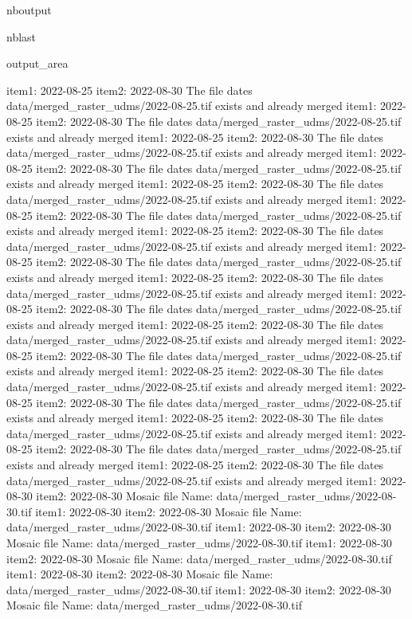 \documentclass[letterpaper,10pt]{sphinxmanual}
\begin{document}
\begin{sphinxuseclass}{nboutput}
\begin{sphinxuseclass}{nblast}
{\begin{sphinxuseclass}{output_area}
\begin{sphinxuseclass}{}
\begin{sphinxVerbatim}[commandchars=\\\{\}]
item1:  2022-08-25
item2:  2022-08-30
The file dates data/merged\_raster\_udms/2022-08-25.tif exists and already merged
item1:  2022-08-25
item2:  2022-08-30
The file dates data/merged\_raster\_udms/2022-08-25.tif exists and already merged
item1:  2022-08-25
item2:  2022-08-30
The file dates data/merged\_raster\_udms/2022-08-25.tif exists and already merged
item1:  2022-08-25
item2:  2022-08-30
The file dates data/merged\_raster\_udms/2022-08-25.tif exists and already merged
item1:  2022-08-25
item2:  2022-08-30
The file dates data/merged\_raster\_udms/2022-08-25.tif exists and already merged
item1:  2022-08-25
item2:  2022-08-30
The file dates data/merged\_raster\_udms/2022-08-25.tif exists and already merged
item1:  2022-08-25
item2:  2022-08-30
The file dates data/merged\_raster\_udms/2022-08-25.tif exists and already merged
item1:  2022-08-25
item2:  2022-08-30
The file dates data/merged\_raster\_udms/2022-08-25.tif exists and already merged
item1:  2022-08-25
item2:  2022-08-30
The file dates data/merged\_raster\_udms/2022-08-25.tif exists and already merged
item1:  2022-08-25
item2:  2022-08-30
The file dates data/merged\_raster\_udms/2022-08-25.tif exists and already merged
item1:  2022-08-25
item2:  2022-08-30
The file dates data/merged\_raster\_udms/2022-08-25.tif exists and already merged
item1:  2022-08-25
item2:  2022-08-30
The file dates data/merged\_raster\_udms/2022-08-25.tif exists and already merged
item1:  2022-08-25
item2:  2022-08-30
The file dates data/merged\_raster\_udms/2022-08-25.tif exists and already merged
item1:  2022-08-25
item2:  2022-08-30
The file dates data/merged\_raster\_udms/2022-08-25.tif exists and already merged
item1:  2022-08-25
item2:  2022-08-30
The file dates data/merged\_raster\_udms/2022-08-25.tif exists and already merged
item1:  2022-08-25
item2:  2022-08-30
The file dates data/merged\_raster\_udms/2022-08-25.tif exists and already merged
item1:  2022-08-25
item2:  2022-08-30
The file dates data/merged\_raster\_udms/2022-08-25.tif exists and already merged
item1:  2022-08-30
item2:  2022-08-30
Mosaic file Name:  data/merged\_raster\_udms/2022-08-30.tif
item1:  2022-08-30
item2:  2022-08-30
Mosaic file Name:  data/merged\_raster\_udms/2022-08-30.tif
item1:  2022-08-30
item2:  2022-08-30
Mosaic file Name:  data/merged\_raster\_udms/2022-08-30.tif
item1:  2022-08-30
item2:  2022-08-30
Mosaic file Name:  data/merged\_raster\_udms/2022-08-30.tif
item1:  2022-08-30
item2:  2022-08-30
Mosaic file Name:  data/merged\_raster\_udms/2022-08-30.tif
item1:  2022-08-30
item2:  2022-08-30
Mosaic file Name:  data/merged\_raster\_udms/2022-08-30.tif

\end{sphinxVerbatim}
\end{sphinxuseclass}
\end{sphinxuseclass}}
\end{sphinxuseclass}
\end{sphinxuseclass}
\end{document}
